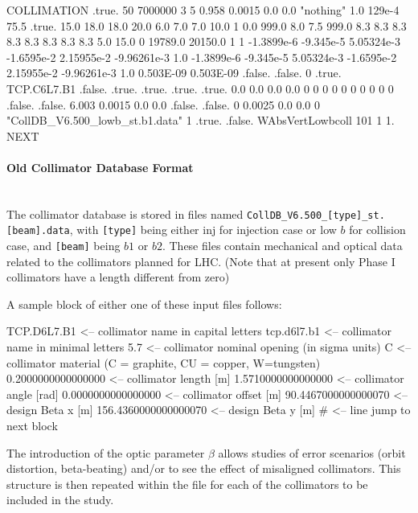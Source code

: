 \bigskip
\begin{cverbatim}
COLLIMATION
   .true.
   50   7000000
   3  5  0.958  0.0015  0.0  0.0  "nothing"  1.0 129e-4  75.5
   .true.  15.0  18.0  18.0  20.0  6.0  7.0  7.0  10.0 1 0.0  999.0  8.0   7.5   999.0
   8.3  8.3  8.3  8.3  8.3  8.3  8.3  8.3  5.0 15.0
   0 19789.0  20150.0  1  1
  -1.3899e-6  -9.345e-5  5.05324e-3  -1.6595e-2  2.15955e-2  -9.96261e-3  1.0
  -1.3899e-6  -9.345e-5  5.05324e-3  -1.6595e-2  2.15955e-2  -9.96261e-3  1.0
   0.503E-09  0.503E-09
  .false. .false. 0 .true. TCP.C6L7.B1 .false. .true. .true. .true. .true.
   0.0 0.0 0.0 0.0
   0   0   0   0   0   0   0   0   0   0   .false.
  .false.  6.003  0.0015
   0.0 0.0 .false. .false.
   0   0.0025  0.0   0.0   0
   "CollDB_V6.500_lowb_st.b1.data"  1
   .true. .false. WAbsVertLowbcoll  101  1  1.
NEXT
\end{cverbatim}

\paragraph{Old Collimator Database Format}~\\

The collimator database is stored in files named \texttt{CollDB\_V6.500\_[type]\_st.[beam].data}, with \texttt{[type]} being either inj for injection case or low $b$ for collision case, and \texttt{[beam]} being $b1$ or $b2$.
These files contain mechanical and optical data related to the collimators planned for LHC. (Note that at present only Phase I collimators have a length different from zero)

A sample block of either one of these input files follows:

\begin{cverbatim}
TCP.D6L7.B1             <-- collimator name in capital letters
tcp.d6l7.b1             <-- collimator name in minimal letters
5.7                     <-- collimator nominal opening (in sigma units)
C                       <-- collimator material (C = graphite, CU = copper, W=tungsten)
  0.2000000000000000    <-- collimator length [m]
  1.5710000000000000    <-- collimator angle [rad]
  0.0000000000000000    <-- collimator offset [m]
 90.4467000000000070    <-- design Beta x [m]
156.4360000000000070    <-- design Beta y [m]
#                       <-- line jump to next block
\end{cverbatim}

The introduction of the optic parameter $\beta$ allows studies of error scenarios (orbit distortion, beta-beating) and/or to see the effect of misaligned collimators.
This structure is then repeated within the file for each of the collimators to be included in the study.

